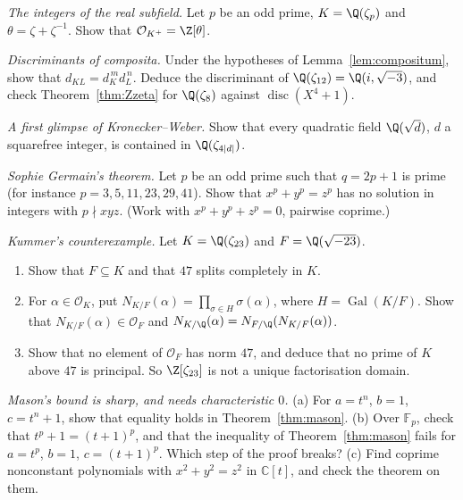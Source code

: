 \begin{exercise}[$\star\star$]\label{ex:realint}
\emph{The integers of the real subfield.} Let $p$ be an odd prime, $K=\Q(\zeta_p)$ and $\theta=\zeta+\zeta^{-1}$. Show that
$\mathcal O_{K^+}=\Z[\theta]$.
\end{exercise}

\begin{exercise}[$\star\star$]\label{ex:compdisc}
\emph{Discriminants of composita.} Under the hypotheses of Lemma~\ref{lem:compositum}, show that $d_{KL}=d_K^{\,m}d_L^{\,n}$.
Deduce the discriminant of $\Q(\zeta_{12})=\Q(i,\sqrt{-3})$, and check Theorem~\ref{thm:Zzeta} for $\Q(\zeta_8)$ against
$\operatorname{disc}(X^4+1)$.
\end{exercise}

\begin{exercise}[$\star\star$]\label{ex:quadcyclo}
\emph{A first glimpse of Kronecker--Weber.} Show that every quadratic field $\Q(\sqrt d)$, $d$ a squarefree integer, is
contained in $\Q(\zeta_{4|d|})$.
\end{exercise}

\begin{exercise}[$\star\star\star$]\label{ex:germain}
\emph{Sophie Germain's theorem.} Let $p$ be an odd prime such that $q=2p+1$ is prime (for instance $p=3,5,11,23,29,41$).
Show that $x^p+y^p=z^p$ has no solution in integers with $p\nmid xyz$. (Work with $x^p+y^p+z^p=0$, pairwise coprime.)
\end{exercise}

\begin{exercise}[$\star\star\star$]\label{ex:kummer23}
\emph{Kummer's counterexample.} Let $K=\Q(\zeta_{23})$ and $F=\Q(\sqrt{-23})$.
\begin{enumerate}[label=(\alph*)]
\item Show that $F\subseteq K$ and that $47$ splits completely in $K$.
\item For $\alpha\in\mathcal O_K$, put $N_{K/F}(\alpha)=\prod_{\sigma\in H}\sigma(\alpha)$, where $H=\operatorname{Gal}(K/F)$.
Show that $N_{K/F}(\alpha)\in\mathcal O_F$ and $N_{K/\Q}(\alpha)=N_{F/\Q}(N_{K/F}(\alpha))$.
\item Show that no element of $\mathcal O_F$ has norm $47$, and deduce that no prime of $K$ above $47$ is principal. So
$\Z[\zeta_{23}]$ is not a unique factorisation domain.
\end{enumerate}
\end{exercise}

\begin{exercise}[$\star\star$]\label{ex:masonsharp}
\emph{Mason's bound is sharp, and needs characteristic $0$.} (a) For $a=t^n$, $b=1$, $c=t^n+1$, show that equality holds in
Theorem~\ref{thm:mason}. (b) Over $\mathbb F_p$, check that $t^p+1=(t+1)^p$, and that the inequality of Theorem~\ref{thm:mason}
fails for $a=t^p$, $b=1$, $c=(t+1)^p$. Which step of the proof breaks? (c) Find coprime nonconstant polynomials with
$x^2+y^2=z^2$ in $\mathbb C[t]$, and check the theorem on them.
\end{exercise}

